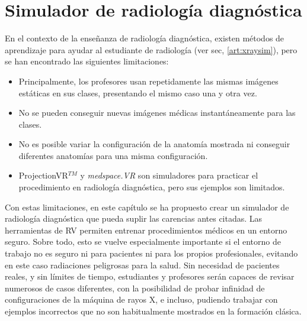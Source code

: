 \chapter{Simulador de radiología diagnóstica} 
\label{cap:xray}

 




En el contexto de la enseñanza de radiología diagnóstica, existen métodos de aprendizaje para ayudar al estudiante de radiología (ver sec, \ref{art:xraysim}), pero se han encontrado las siguientes limitaciones:

\begin{itemize}
\item Principalmente, los profesores usan repetidamente las mismas imágenes estáticas en sus clases, presentando el mismo caso una y otra vez.
\item No se pueden conseguir nuevas imágenes médicas instantáneamente para las clases.
\item No es posible variar la configuración de la anatomía mostrada ni conseguir diferentes anatomías para una misma configuración.
\item ProjectionVR$^{TM}$\cite{shanahan2016student} y \emph{medspace.VR} \cite{medspace} son simuladores para practicar el procedimiento en radiología diagnóstica, pero sus ejemplos son limitados.
\end{itemize}

Con estas limitaciones, en este capítulo se ha propuesto crear un simulador de radiología diagnóstica que pueda suplir las carencias antes citadas. Las herramientas de \ac{RV} permiten entrenar procedimientos médicos en un entorno seguro. Sobre todo, esto se vuelve especialmente importante si el entorno de trabajo no es seguro ni para pacientes ni para los propios profesionales, evitando en este caso radiaciones peligrosas para la salud. Sin necesidad de pacientes reales, y sin límites de tiempo, estudiantes y profesores serán capaces de revisar numerosos de casos diferentes, con la posibilidad de probar infinidad de configuraciones de la máquina de rayos X, e incluso, pudiendo trabajar con ejemplos incorrectos que no son habitualmente mostrados en la formación clásica.

